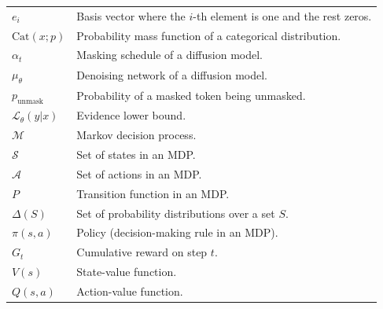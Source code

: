 \documentclass[english, 12pt, a4paper, sci, utf8, a-2b, online]{aaltothesis}
\theoremstyle{definition}
\theoremstyle{plain}
\theoremstyle{remark}
\begin{document}
\begin{tabular}{ll}
    $e_i$                                                    & Basis vector where the $i$-th element is one and the rest zeros.  \\
    $\text{Cat}(x; p)$                                       & Probability mass function of a categorical distribution.          \\
    $\alpha_t$                                               & Masking schedule of a diffusion model.                            \\
    $\mu_\theta$                                             & Denoising network of a diffusion model.                           \\
    $p_{\text{unmask}}$                                      & Probability of a masked token being unmasked.                     \\
    $\mathcal{L}_\theta(y | x)$                              & Evidence lower bound.                                             \\
    $\mathcal{M}$                                            & Markov decision process.                                          \\
    $\mathcal{S}$                                            & Set of states in an MDP.                                          \\
    $\mathcal{A}$                                            & Set of actions in an MDP.                                         \\
    $P$                                                      & Transition function in an MDP.                                    \\
    $\Delta(S)$                                              & Set of probability distributions over a set $S$.                  \\
    $\pi(s, a)$                                              & Policy (decision-making rule in an MDP).                          \\
    $G_t$                                                    & Cumulative reward on step $t$.                                    \\
    $V(s)$                                                   & State-value function.                                             \\
    $Q(s, a)$                                                & Action-value function.                                            \\

\end{tabular}
\end{document}
